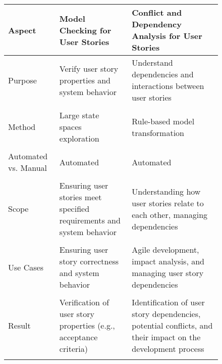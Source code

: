 \begin{figure}[h]
\begingroup
\scriptsize
\centering
\begin{tabularx}{\textwidth}{l  X  X}
\hline
Aspect	&Model Checking for User Stories &	Conflict and Dependency Analysis for User Stories \\
\hline\hline
Purpose	&Verify user story properties and system behavior	&Understand dependencies and interactions between user stories \\\\ 
Method&	Large state spaces exploration&	Rule-based model transformation\\\\ 
Automated vs. Manual&	Automated	&Automated\\\\ 
Scope&	Ensuring user stories meet specified requirements and system behavior	&Understanding how user stories relate to each other, managing dependencies\\\\ 
Use Cases&	Ensuring user story correctness and system behavior	&Agile development, impact analysis, and managing user story dependencies\\\\ 
Result	&Verification of user story properties (e.g., acceptance criteria)	&Identification of user story dependencies, potential conflicts, and their impact on the development process\\\\ 
\hline
\end{tabularx}
\label{tb:sec_6_comparative_analysis}
\endgroup
\end{figure}
